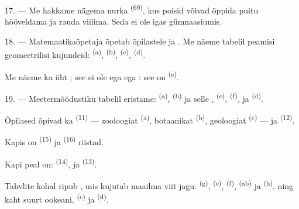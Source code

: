 17. --- Me hakkame nägema nurka  
\textsuperscript{(69)}, kus poisid võivad õppida puitu hööveldama ja rauda viilima.
Seda ei ole igas gümnaasiumis.

\VUsaut{5.0mm}
\VUsaut{3.6mm}

18. --- Matemaatikaõpetaja õpetab õpilastele  ja . Me näeme tabelil peamisi geomeetrilisi
kujundeid:  \textsuperscript{(a)},  \textsuperscript{(b)},
 \textsuperscript{(c)},  \textsuperscript{(d)}.

Me näeme ka üht ; see ei ole  ega 
ega : see on  \textsuperscript{(e)}.

19. --- Meetermõõdustiku tabelil eristame:  \textsuperscript{(a)},
 \textsuperscript{(b)} ja selle , 
\textsuperscript{(e)},  \textsuperscript{(f)}, 
ja  \textsuperscript{(d)}.

Õpilased õpivad ka  \textsuperscript{(11)} --- zooloogiat
\textsuperscript{(a)}, botaanikat \textsuperscript{(b)}, geoloogiat
\textsuperscript{(c)} --- ja  \textsuperscript{(12)}.

Kapis on  \textsuperscript{(15)} ja 
\textsuperscript{(16)} riistad.

Kapi peal on:  \textsuperscript{(14)},  ja
 \textsuperscript{(13)}.

Tahvlite kohal ripub , mis kujutab maailma viit jagu:
 \textsuperscript{(g)},  \textsuperscript{(e)},
 \textsuperscript{(f)},  \textsuperscript{(ab)} ja
 \textsuperscript{(h)}, ning kaht suurt ookeani, 
\textsuperscript{(c)} ja  \textsuperscript{(d)}.
\VUsaut{6.0mm}
\VUfilet{22mm}
